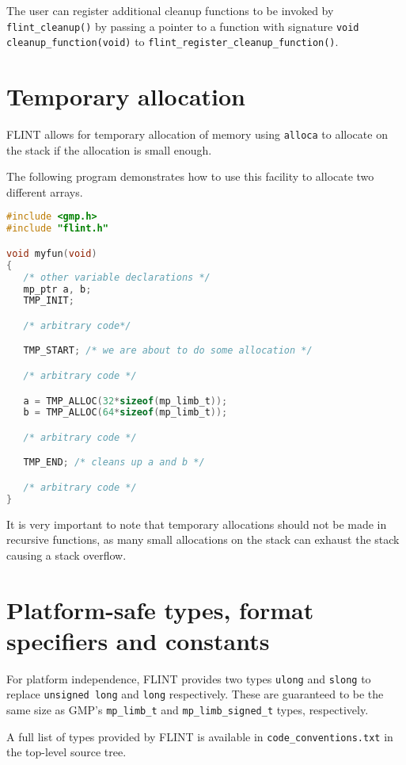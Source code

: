 \documentclass[a4paper,10pt]{book}
\newcommand{\code}{\lstinline}
\begin{document}
The user can register additional cleanup functions to be invoked
by \code{flint_cleanup()} by passing a pointer
to a function with signature \code{void cleanup_function(void)}
to \code{flint_register_cleanup_function()}.

\chapter{Temporary allocation}

FLINT allows for temporary allocation of memory using \code{alloca}
to allocate on the stack if the allocation is small enough.

The following program demonstrates how to use this facility to
allocate two different arrays.

\begin{lstlisting}[language=C]
#include <gmp.h>
#include "flint.h"

void myfun(void)
{
   /* other variable declarations */
   mp_ptr a, b;
   TMP_INIT;

   /* arbitrary code*/

   TMP_START; /* we are about to do some allocation */

   /* arbitrary code */

   a = TMP_ALLOC(32*sizeof(mp_limb_t));
   b = TMP_ALLOC(64*sizeof(mp_limb_t));

   /* arbitrary code */

   TMP_END; /* cleans up a and b */

   /* arbitrary code */
}
\end{lstlisting}

It is very important to note that temporary allocations should not be
made in recursive functions, as many small allocations on the stack
can exhaust the stack causing a stack overflow.

\chapter{Platform-safe types, format specifiers and constants}

For platform independence, FLINT provides two types \code{ulong}
and \code{slong} to replace \code{unsigned long} and \code{long}
respectively. These are guaranteed to be the same size as GMP's
\code{mp_limb_t} and \code{mp_limb_signed_t} types, respectively.

A full list of types provided by FLINT is available in
\code{code_conventions.txt} in the top-level source tree.
\end{document}

